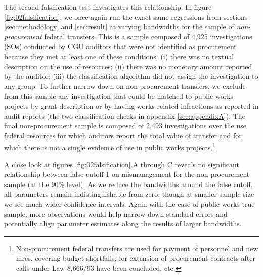 \documentclass[11pt]{article}
\begin{document}
The second falsification test investigates this relationship. In figure \ref{fig:02falsification}, we once again run the exact same regressions from sections \ref{sec:methodology} and \ref{sec:result} at varying bandwidths for the sample of \emph{non-procurement} federal transfers. This is a sample composed of 4,925 investigations (SOs) conducted by CGU auditors that were not identified as procurement because they met at least one of these conditions: (i) there was no textual description on the use of resources; (ii) there was no monetary amount reported by the auditor; (iii) the classification algorithm did not assign the investigation to any group. To further narrow down on non-procurement transfers, we exclude from this sample any investigation that could be matched to public works projects by grant description or by having works-related infractions as reported in audit reports (the two classification checks in appendix \ref{sec:appendixA}). The final non-procurement sample is composed of 2,493 investigations over the use federal resources for which auditors report the total value of transfer and for which there is not a single evidence of use in public works projects.\footnote{Non-procurement federal transfers are used for payment of personnel and new hires, covering budget shortfalls, for extension of procurement contracts after calls under Law 8,666/93 have been concluded, etc.}

A close look at figures \ref{fig:02falsification}.A through C reveals  no significant relationship between false cutoff 1 on mismanagement for the non-procurement sample (at the 90\% level). As we reduce the bandwidths around the false cutoff, all parameters remain indistinguishable from zero, though at smaller sample size we see much wider confidence intervals. Again with the case of public works true sample, more observations would help narrow down standard errors and potentially align parameter estimates along the results of larger bandwidths.
\clearpage
\end{document}
